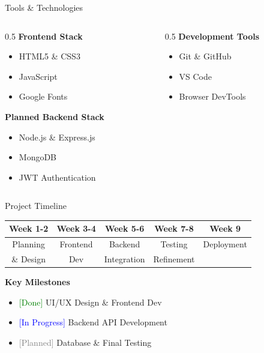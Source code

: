 \documentclass{beamer}
\begin{document}
\begin{frame}{Tools \& Technologies }
    \begin{columns}
        \begin{column}{0.5\textwidth}
            \textbf{Frontend Stack }
            \begin{itemize}
                \item HTML5 \& CSS3 
                \item JavaScript 
                \item Google Fonts 
            \end{itemize}
            \textbf{Planned Backend Stack }
            \begin{itemize}
                \item Node.js \& Express.js 
                \item MongoDB 
                \item JWT Authentication
            \end{itemize}
        \end{column}
        \begin{column}{0.5\textwidth}
            \textbf{Development Tools }
            \begin{itemize}
                \item Git \& GitHub 
                \item VS Code 
                \item Browser DevTools 
            \end{itemize}
        \end{column}
    \end{columns}
\end{frame}

\begin{frame}{Project Timeline }
    \centering
    \footnotesize
    \begin{tabular}{|c|c|c|c|c|}
    \hline
    \textbf{Week 1-2} & \textbf{Week 3-4} & \textbf{Week 5-6} & \textbf{Week 7-8} & \textbf{Week 9} \\ \hline
    Planning & Frontend & Backend & Testing & Deployment \\ 
    \& Design & Dev & Integration & Refinement & \\ \hline
    \end{tabular}
    
    \vspace{0.5cm}
    \flushleft \normalsize \textbf{Key Milestones }
    \begin{itemize}
        \item \textcolor{green}{[Done]} UI/UX Design \& Frontend Dev 
        \item \textcolor{blue}{[In Progress]} Backend API Development 
        \item \textcolor{gray}{[Planned]} Database \& Final Testing 
    \end{itemize}
\end{frame}
\end{document}
